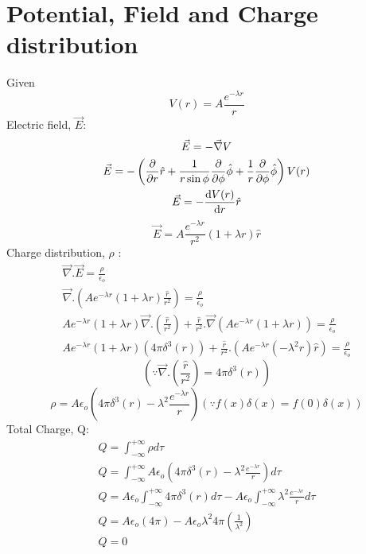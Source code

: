 \documentclass[11pt, a4paper]{article}
\begin{document}
 
    



%
\tableofcontents

\clearpage

\section{Potential, Field and Charge distribution}
Given 
\begin{equation} 
    V(r) = A \frac{e^{-\lambda r}}{r} \label{eq:1} 
\end{equation} 
Electric field, \(\vec{E}\):
\begin{gather}
    \vec{E} = -\vec{\nabla}V \\
    \vec{E} = -\left(\pdv{}{r}\hat{r}+\frac{1}{r \sin \phi}\pdv{}{\phi}\hat{\phi}+\frac{1}{r}\pdv{}{\phi}\hat{\phi}\right)V(r) \\
    \vec{E} = -\odv{V(r)}{r}\hat{r} 
\end{gather}
\begin{equation}
    \boxed{\vec{E} = A \frac{e^{-\lambda r}}{r^2} (1 + \lambda r)\hat{r}}
\end{equation}
Charge distribution, \(\rho\) :
\begin{gather}
    \vec{\nabla}.\vec{E} = \frac{\rho}{\epsilon_o} \\
    \vec{\nabla}.\left(A e^{-\lambda r} (1 + \lambda r)\frac{\hat{r}}{r^2}\right) = \frac{\rho}{\epsilon_o} \\
    A e^{-\lambda r} (1 + \lambda r)\vec{\nabla}.\left(\frac{\hat{r}}{r^2}\right)+ \frac{\hat{r}}{r^2}.\vec{\nabla}(A e^{-\lambda r} (1 + \lambda r))= \frac{\rho}{\epsilon _o} \\
    A e^{-\lambda r} (1 + \lambda r) (4 \pi \delta^3(r)) + \frac{\hat{r}}{r^2}.(A e^{-\lambda r}(-\lambda^2 r)\hat{r} )= \frac{\rho}{\epsilon_o} 
\end{gather}
\[
    \left(\because \vec{\nabla}.\left(\frac{\hat{r}}{r^2}\right) = 4 \pi \delta^3(r)\right)
\]
\begin{equation}
    \boxed{\rho = A\epsilon_o \left( 4 \pi \delta^3(r) -  \lambda^2\frac{e^{-\lambda r}}{r}\right)} \left(\because f(x)\delta(x)= f(0)\delta(x)\right)
\end{equation}
Total Charge, Q:
\begin{gather}
    Q = \int_{-\infty}^{+\infty} \rho d\tau\\
    Q = \int_{-\infty}^{+\infty} A\epsilon_o \left( 4 \pi \delta^3(r) -  \lambda^2\frac{e^{-\lambda r}}{r}\right) d\tau \\
    Q = A\epsilon_o \int_{-\infty}^{+\infty}4 \pi \delta^3(r) d\tau - A \epsilon_{o} \int_{-\infty}^{+\infty} \lambda^2\frac{e^{-\lambda r} }{r} d\tau \\
    Q = A \epsilon_{o} (4 \pi) - A \epsilon_{o} \lambda^2 4 \pi(\frac{1}{\lambda^2})\\
    \boxed{Q = 0}
\end{gather}
\end{document}
